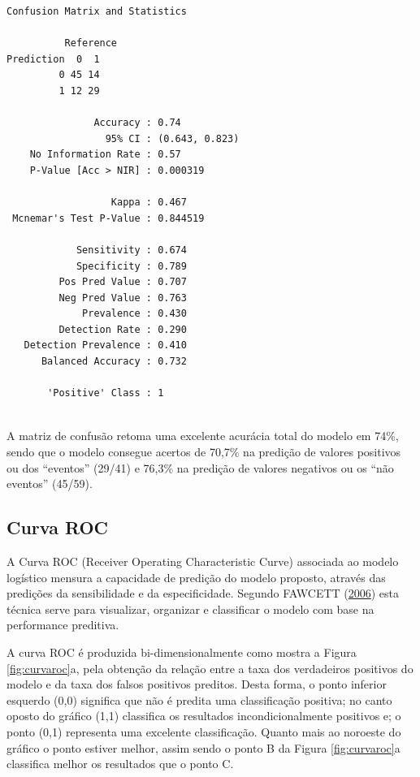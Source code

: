 \documentclass[12pt,brazil,oneside]{book}
\begin{document}
\begin{verbatim}
Confusion Matrix and Statistics

          Reference
Prediction  0  1
         0 45 14
         1 12 29
                                        
               Accuracy : 0.74          
                 95% CI : (0.643, 0.823)
    No Information Rate : 0.57          
    P-Value [Acc > NIR] : 0.000319      
                                        
                  Kappa : 0.467         
 Mcnemar's Test P-Value : 0.844519      
                                        
            Sensitivity : 0.674         
            Specificity : 0.789         
         Pos Pred Value : 0.707         
         Neg Pred Value : 0.763         
             Prevalence : 0.430         
         Detection Rate : 0.290         
   Detection Prevalence : 0.410         
      Balanced Accuracy : 0.732         
                                        
       'Positive' Class : 1             
                                        
\end{verbatim}

A matriz de confusão retoma uma excelente acurácia total do modelo em 74\%, sendo que o modelo consegue acertos de 70,7\% na predição de valores positivos ou dos ``eventos'' (29/41) e 76,3\% na predição de valores negativos ou os ``não eventos'' (45/59).

\hypertarget{curva-roc}{%
\subsection{Curva ROC}\label{curva-roc}}

A Curva ROC (Receiver Operating Characteristic Curve) associada ao modelo logístico mensura a capacidade de predição do modelo proposto, através das predições da sensibilidade e da especificidade. Segundo FAWCETT (\protect\hyperlink{ref-Fawcett2006}{2006}) esta técnica serve para visualizar, organizar e classificar o modelo com base na performance preditiva.

A curva ROC é produzida bi-dimensionalmente como mostra a Figura \ref{fig:curvaroc}a, pela obtenção da relação entre a taxa dos verdadeiros positivos do modelo e da taxa dos falsos positivos preditos. Desta forma, o ponto inferior esquerdo (0,0) significa que não é predita uma classificação positiva; no canto oposto do gráfico (1,1) classifica os resultados incondicionalmente positivos e; o ponto (0,1) representa uma excelente classificação. Quanto mais ao noroeste do gráfico o ponto estiver melhor, assim sendo o ponto B da Figura \ref{fig:curvaroc}a classifica melhor os resultados que o ponto C.
\end{document}
